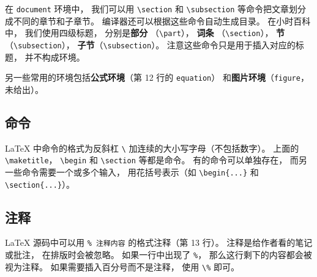 在 \verb|document| 环境中， 我们可以用 \verb|\section| 和 \verb|\subsection| 等命令把文章划分成不同的章节和子章节。 编译器还可以根据这些命令自动生成目录。 在小时百科中， 我们使用四级标题， 分别是\textbf{部分} （\verb|\part|）， \textbf{词条} （\verb|\section|）， \textbf{节}（\verb|\subsection|）， \textbf{子节}（\verb|\subsection|）。 注意这些命令只是用于插入对应的标题， 并不构成环境。

另一些常用的环境包括\textbf{公式环境}（第 12 行的 \verb|equation|） 和\textbf{图片环境}（\verb|figure|， 未给出）。

\subsection{命令}
LaTeX 中命令的格式为反斜杠 \verb|\| 加连续的大小写字母（不包括数字）。 上面的 \verb|\maketitle|， \verb|\begin| 和 \verb|\section| 等都是命令。 有的命令可以单独存在， 而另一些命令需要一个或多个输入， 用花括号表示（如 \verb|\begin{...}| 和 \verb|\section{...}|）。

\subsection{注释}
LaTeX 源码中可以用 \verb|% 注释内容| 的格式注释（第 13 行）。 注释是给作者看的笔记或批注， 在排版时会被忽略。 如果一行中出现了 \verb|%|， 那么这行剩下的内容都会被视为注释。 如果需要插入百分号而不是注释， 使用 \verb|\%| 即可。

